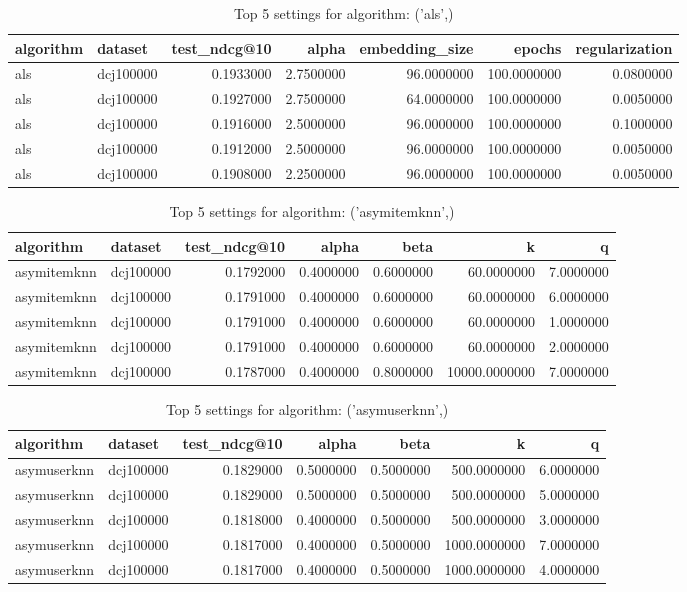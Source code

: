 \begin{table}
\caption{Top 5 settings for algorithm: ('als',)}
\label{tab:('als',)_top5}
\begin{tabular}{llrrrrr}
\toprule
algorithm & dataset & test_ndcg@10 & alpha & embedding_size & epochs & regularization \\
\midrule
als & dcj100000 & 0.1933000 & 2.7500000 & 96.0000000 & 100.0000000 & 0.0800000 \\
als & dcj100000 & 0.1927000 & 2.7500000 & 64.0000000 & 100.0000000 & 0.0050000 \\
als & dcj100000 & 0.1916000 & 2.5000000 & 96.0000000 & 100.0000000 & 0.1000000 \\
als & dcj100000 & 0.1912000 & 2.5000000 & 96.0000000 & 100.0000000 & 0.0050000 \\
als & dcj100000 & 0.1908000 & 2.2500000 & 96.0000000 & 100.0000000 & 0.0050000 \\
\bottomrule
\end{tabular}
\end{table}


\begin{table}
\caption{Top 5 settings for algorithm: ('asymitemknn',)}
\label{tab:('asymitemknn',)_top5}
\begin{tabular}{llrrrrr}
\toprule
algorithm & dataset & test_ndcg@10 & alpha & beta & k & q \\
\midrule
asymitemknn & dcj100000 & 0.1792000 & 0.4000000 & 0.6000000 & 60.0000000 & 7.0000000 \\
asymitemknn & dcj100000 & 0.1791000 & 0.4000000 & 0.6000000 & 60.0000000 & 6.0000000 \\
asymitemknn & dcj100000 & 0.1791000 & 0.4000000 & 0.6000000 & 60.0000000 & 1.0000000 \\
asymitemknn & dcj100000 & 0.1791000 & 0.4000000 & 0.6000000 & 60.0000000 & 2.0000000 \\
asymitemknn & dcj100000 & 0.1787000 & 0.4000000 & 0.8000000 & 10000.0000000 & 7.0000000 \\
\bottomrule
\end{tabular}
\end{table}


\begin{table}
\caption{Top 5 settings for algorithm: ('asymuserknn',)}
\label{tab:('asymuserknn',)_top5}
\begin{tabular}{llrrrrr}
\toprule
algorithm & dataset & test_ndcg@10 & alpha & beta & k & q \\
\midrule
asymuserknn & dcj100000 & 0.1829000 & 0.5000000 & 0.5000000 & 500.0000000 & 6.0000000 \\
asymuserknn & dcj100000 & 0.1829000 & 0.5000000 & 0.5000000 & 500.0000000 & 5.0000000 \\
asymuserknn & dcj100000 & 0.1818000 & 0.4000000 & 0.5000000 & 500.0000000 & 3.0000000 \\
asymuserknn & dcj100000 & 0.1817000 & 0.4000000 & 0.5000000 & 1000.0000000 & 7.0000000 \\
asymuserknn & dcj100000 & 0.1817000 & 0.4000000 & 0.5000000 & 1000.0000000 & 4.0000000 \\
\bottomrule
\end{tabular}
\end{table}


